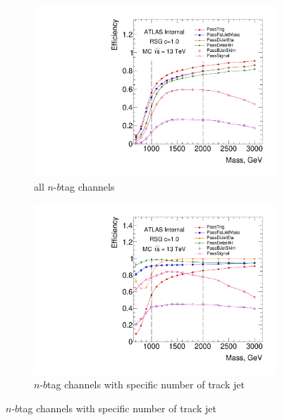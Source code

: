 \begin{figure}[htbp!]
    \captionsetup{justification=centering}
    \begin{subfigure}[b]{0.45\textwidth}
        \includegraphics[width=\textwidth,angle=-90]{figures/boosted/SigEff/evtsel_Moriond_Efficiency_PreSel.pdf}
        \caption{all $n$-$b$tag channels}
        \label{fig:boosted-selection-efficiency-abs}
    \end{subfigure}
    \quad
    \begin{subfigure}[b]{0.45\textwidth}
        \includegraphics[width=\textwidth,angle=-90]{figures/boosted/SigEff/evtsel_Moriond_Efficiency_PreSel_rel.pdf}
        \caption{$n$-$b$tag channels with specific number of track jet}
        \label{fig:boosted-selection-efficiency-rel}
    \end{subfigure}

\end{figure}
